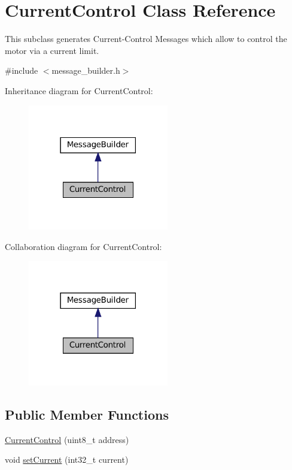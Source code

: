 \hypertarget{classCurrentControl}{}\section{Current\+Control Class Reference}
\label{classCurrentControl}


This subclass generates Current-\/\+Control Messages which allow to control the motor via a current limit.  




{\ttfamily \#include $<$message\+\_\+builder.\+h$>$}



Inheritance diagram for Current\+Control\+:\nopagebreak
\begin{figure}[H]
\begin{center}
\leavevmode
\includegraphics[width=174pt]{classCurrentControl__inherit__graph}
\end{center}
\end{figure}


Collaboration diagram for Current\+Control\+:\nopagebreak
\begin{figure}[H]
\begin{center}
\leavevmode
\includegraphics[width=174pt]{classCurrentControl__coll__graph}
\end{center}
\end{figure}
\subsection*{Public Member Functions}
\begin{DoxyCompactItemize}
\item 
\hyperlink{classCurrentControl_a3e56845d95613d4c55d7b8dde7cc8300}{Current\+Control} (uint8\+\_\+t address)
\item 
void \hyperlink{classCurrentControl_a5096783dd03da0895cd352fc9977736d}{set\+Current} (int32\+\_\+t current)
\end{DoxyCompactItemize}
